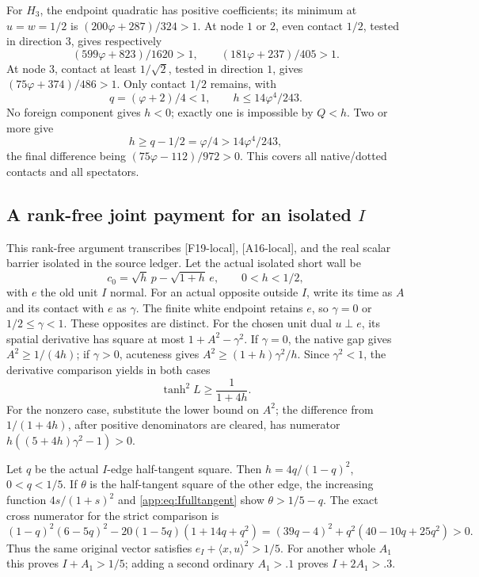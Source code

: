 \documentclass[11pt]{article}
\theoremstyle{definition}
\theoremstyle{remark}
\newcommand{\ip}[2]{\langle #1,#2\rangle}
\newcommand{\src}[1]{\textnormal{\textsf{[#1]}}}
\begin{document}
For \(H_3\), the endpoint quadratic has positive coefficients;
its minimum at \(u=w=1/2\) is
\((200\varphi+287)/324>1\).
At node \(1\) or \(2\), even contact \(1/2\), tested in
direction \(3\), gives respectively
\[
 (599\varphi+823)/1620>1,\qquad
 (181\varphi+237)/405>1.
\]
At node \(3\), contact at least \(1/\sqrt2\), tested in
direction \(1\), gives \((75\varphi+374)/486>1\).
Only contact \(1/2\) remains, with
\[
 q=(\varphi+2)/4<1,\qquad h\leq14\varphi^4/243.
\]
No foreign component gives \(h<0\); exactly one is impossible
by \(Q<h\). Two or more give
\[
 h\geq q-1/2=\varphi/4>14\varphi^4/243,
\]
the final difference being \((75\varphi-112)/972>0\).
This covers all native/dotted contacts and all spectators.

\subsection{A rank-free joint payment for an isolated \(I\)}
\label{app:Ijoint}
This rank-free argument transcribes \src{F19-local}, \src{A16-local},
and the real scalar barrier isolated in the source ledger.
Let the actual isolated short wall be
\[
 c_0=\sqrt h\,p-\sqrt{1+h}\,e,\qquad0<h<1/2,
\]
with \(e\) the old unit \(I\) normal.
For an actual opposite outside \(I\), write its time as \(A\)
and its contact with \(e\) as \(\gamma\).
The finite white endpoint retains \(e\), so \(\gamma=0\)
or \(1/2\leq\gamma<1\). These opposites are distinct.
For the chosen unit dual \(u\perp e\), its spatial derivative
has square at most \(1+A^2-\gamma^2\).
If \(\gamma=0\), the native gap gives \(A^2\geq1/(4h)\);
if \(\gamma>0\), acuteness gives
\(A^2\geq(1+h)\gamma^2/h\).
Since \(\gamma^2<1\), the derivative comparison yields in
both cases
\begin{equation}\label{app:eq:Ifulltangent}
 \tanh^2L\geq\frac1{1+4h}.
\end{equation}
For the nonzero case, substitute the lower bound on \(A^2\);
the difference from \(1/(1+4h)\), after positive denominators
are cleared, has numerator \(h((5+4h)\gamma^2-1)>0\).

Let \(q\) be the actual \(I\)-edge half-tangent square.
Then \(h=4q/(1-q)^2\), \(0<q<1/5\).
If \(\theta\) is the half-tangent square of the other edge,
the increasing function \(4s/(1+s)^2\) and
\eqref{app:eq:Ifulltangent} show \(\theta>1/5-q\).
The exact cross numerator for the strict comparison is
\[
 (1-q)^2(6-5q)^2-20(1-5q)(1+14q+q^2)
 =(39q-4)^2+q^2(40-10q+25q^2)>0.
\]
Thus the same original vector satisfies
\(e_I+\ip{x}{u}^2>1/5\).
For another whole \(A_1\) this proves \(I+A_1>1/5\);
adding a second ordinary \(A_1>.1\) proves \(I+2A_1>.3\).
\end{document}
